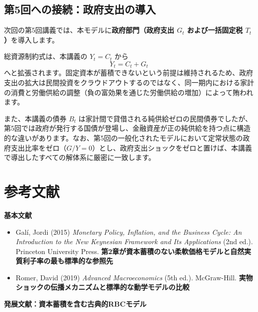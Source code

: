 \documentclass[
  japanese,
  lualatex,
  ja=standard,
  12pt,
  a4paper]{ltjsarticle}
\providecommand{\tightlist}{%
  \setlength{\itemsep}{0pt}\setlength{\parskip}{0pt}}
\begin{document}
\subsection{第5回への接続：政府支出の導入}\label{ux7b2c5ux56deux3078ux306eux63a5ux7d9aux653fux5e9cux652fux51faux306eux5c0eux5165}

次回の第5回講義では、本モデルに\textbf{政府部門（政府支出 \(G_t\)
および一括固定税 \(T_t\)）}を導入します。

総資源制約式は、本講義の \(Y_t = C_t\) から \[
Y_t = C_t + G_t
\]
へと拡張されます。固定資本が蓄積できないという前提は維持されるため、政府支出の拡大は民間投資をクラウドアウトするのではなく、同一期内における家計の消費と労働供給の調整（負の富効果を通じた労働供給の増加）によって賄われます。

また、本講義の債券 \(B_t\)
は家計間で貸借される純供給ゼロの民間債券でしたが、第5回では政府が発行する国債が登場し、金融資産が正の純供給を持つ点に構造的な違いがあります。なお、第5回の一般化されたモデルにおいて定常状態の政府支出比率をゼロ（\(G/Y = 0\)）とし、政府支出ショックをゼロと置けば、本講義で導出したすべての解体系に厳密に一致します。

\section{参考文献}\label{ux53c2ux8003ux6587ux732e}

\textbf{基本文献}

\begin{itemize}
\tightlist
\item
  Galí, Jordi (2015) \emph{Monetary Policy, Inflation, and the Business
  Cycle: An Introduction to the New Keynesian Framework and Its
  Applications} (2nd ed.). Princeton University Press.
  \textbf{第2章が資本蓄積のない柔軟価格モデルと自然実質利子率の最も標準的な参照先}
\item
  Romer, David (2019) \emph{Advanced Macroeconomics} (5th ed.).
  McGraw-Hill.
  \textbf{実物ショックの伝播メカニズムと標準的な動学モデルの比較}
\end{itemize}

\textbf{発展文献：資本蓄積を含む古典的RBCモデル}
\end{document}

